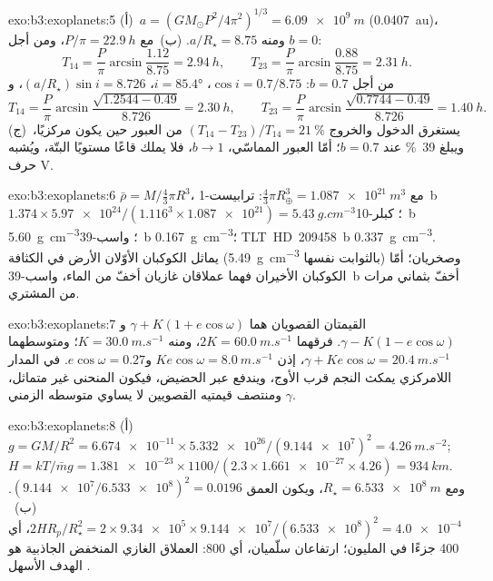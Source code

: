 \begin{solution}{exo:b3:exoplanets:5}
(أ)~$a = (GM_\odot P^2/4\pi^2)^{1/3} = \qty{6.09e9}{m}$ (\qty{0.0407}{au})،
ومنه $a/R_\star = 8.75$. (ب)~مع $P/\pi = \qty{22.9}{h}$، ومن أجل $b = 0$:
\[
T_{14} = \frac P\pi\arcsin\frac{1.12}{8.75} = \qty{2.94}{h}, \qquad
T_{23} = \frac P\pi\arcsin\frac{0.88}{8.75} = \qty{2.31}{h}.
\]
من أجل $b = 0.7$: $\cos i = 0.7/8.75$، $i = \ang{85.4}$، $(a/R_\star)\sin i =
8.726$،
و\[
T_{14} = \frac P\pi\arcsin\frac{\sqrt{1.2544 - 0.49}}{8.726} = \qty{2.30}{h},
\qquad
T_{23} = \frac P\pi\arcsin\frac{\sqrt{0.7744 - 0.49}}{8.726} = \qty{1.40}{h}.
\]
(ج)~يستغرق الدخول والخروج $(T_{14} - T_{23})/T_{14} = \qty{21}{\percent}$
من العبور حين يكون مركزيًا، ويبلغ \qty{39}{\percent} عند $b = 0.7$؛ أمّا
العبور المماسّي، $b \to 1$، فلا يملك قاعًا مستويًا البتّة، ويُشبه حرف V.
\end{solution}

\begin{solution}{exo:b3:exoplanets:6}
$\bar\rho = M/\tfrac43\pi R^3$، مع $\tfrac43\pi R_\oplus^3 =
\qty{1.087e21}{m^3}$: ترابيست-1~b $1.374\times\num{5.97e24}/(1.116^3\times
\num{1.087e21}) = \qty{5.43}{g.cm^{-3}}$؛ كبلر-10~b
\qty{5.60}{g.cm^{-3}}؛ واسب-39~b \qty{0.167}{g.cm^{-3}}؛ \mbox{\textdir TLT HD~209458~b}
\qty{0.337}{g.cm^{-3}}. يماثل الكوكبان الأوّلان الأرض في الكثافة
(\qty{5.49}{g.cm^{-3}} بالثوابت نفسها) وصخريان؛ أمّا الكوكبان الأخيران
فهما عملاقان غازيان أخفّ من الماء، واسب-39~b أخفّ بثماني مرات من
المشتري.
\end{solution}

\begin{solution}{exo:b3:exoplanets:7}
القيمتان القصويان هما $\gamma + K(1 + e\cos\omega)$ و$\gamma - K(1 -
e\cos\omega)$. فرقهما $2K = \qty{60.0}{m.s^{-1}}$، ومنه $K =
\qty{30.0}{m.s^{-1}}$؛ ومتوسطهما $\gamma + Ke\cos\omega =
\qty{20.4}{m.s^{-1}}$، إذن $Ke\cos\omega = \qty{8.0}{m.s^{-1}}$
و$e\cos\omega = 0.27$. في المدار اللامركزي يمكث النجم قرب
الأوج، ويندفع عبر الحضيض، فيكون المنحنى غير متماثل،
ومنتصف قيمتيه القصويين لا يساوي متوسطه الزمني $\gamma$.
\end{solution}

\begin{solution}{exo:b3:exoplanets:8}
(أ)~$g = GM/R^2 = \num{6.674e-11}\times\num{5.332e26}/(\num{9.144e7})^2 =
\qty{4.26}{m.s^{-2}}$; $H = kT/\bar m g = \num{1.381e-23}\times1100/(2.3
\times\num{1.661e-27}\times4.26) = \qty{934}{km}$. ومع $R_\star =
\qty{6.533e8}{m}$، ويكون العمق $(\num{9.144e7}/\num{6.533e8})^2 =
\num{0.0196}$. (ب)~$2HR_p/R_\star^2 = 2\times\num{9.34e5}\times
\num{9.144e7}/(\num{6.533e8})^2 = \num{4.0e-4}$، أي 400 جزءًا في المليون؛
ارتفاعان سلّميان، أي 800: العملاق الغازي المنخفض الجاذبية هو الهدف الأسهل
.
\end{solution}

